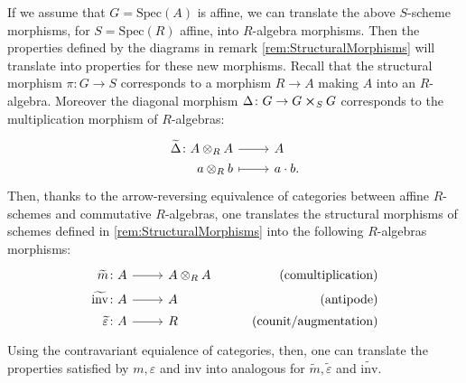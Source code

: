\documentclass[../Main]{subfiles}
\begin{document}
\begin{rem}
	If we assume that $G = \mathrm{Spec}(A)$ is affine, we can translate the above $S$-scheme
	morphisms, for $S = \mathrm{Spec}(R)$ affine, into $R$-algebra morphisms.
	Then the properties defined by the diagrams in remark \ref{rem:StructuralMorphisms}
	will translate into properties for these new morphisms.
	Recall that the structural morphism $\pi\colon G \to S$ corresponds to a
	morphism $R \to A$ making $A$ into an $R$-algebra.
	Moreover the diagonal morphism $\Delta\colon G \to G \cross_{ S } G$ corresponds
	to the multiplication morphism of $R$-algebras:
	\begin{equation}
	\begin{tikzcd}[row sep = 0ex
		,/tikz/column 1/.append style={anchor=base east}
		,/tikz/column 2/.append style={anchor=base west}]
		\widetilde{\Delta}\colon A \otimes_R A \arrow[r, "", rightarrow] &
		A \\
		a \otimes_R b \arrow[r, "", mapsto] & a \cdot b
	.\end{tikzcd}
	\end{equation} 
	Then, thanks to the arrow-reversing equivalence of categories between
	affine $R$-schemes and commutative $R$-algebras, one translates the structural morphisms
	of schemes defined in \ref{rem:StructuralMorphisms} into the following $R$-algebras morphisms:
	\begin{equation}
			\begin{tikzcd}[row sep = 0ex
         ,/tikz/column 1/.append style={anchor=base east}
         ,/tikz/column 2/.append style={anchor=base west}
         ,/tikz/column 3/.append style={anchor=base east}]
			\widetilde{m}\colon A \arrow[r, "", rightarrow] &
			A \otimes_R A & \text{(comultiplication)} \\
			\widetilde{\mathrm{inv}}\colon A \arrow[r, "", rightarrow] &
			A & \text{(antipode)} \\
			\widetilde{\varepsilon} \colon A \arrow[r, "", rightarrow] &
			R & \text{(counit/augmentation)} 
		\end{tikzcd}
	\end{equation} 
	Using the contravariant equialence of categories, then,
	one can translate the properties satisfied by $m, \varepsilon$ and $\mathrm{inv}$
	into analogous for $\widetilde{m}, \widetilde{\varepsilon}$ and $\widetilde{\mathrm{inv}}$.
\end{rem}
\end{document}
